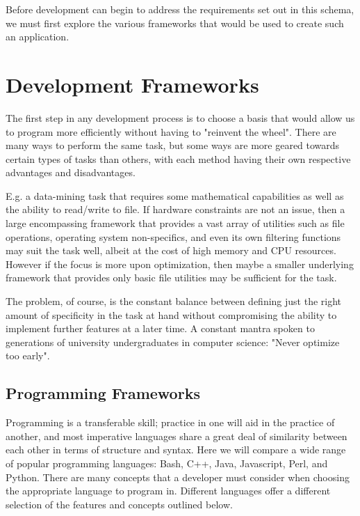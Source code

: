 Before development can begin to address the requirements set out in this schema, we must first explore the various frameworks that would be used to create such an application.


\section{Development Frameworks}

The first step in any development process is to choose a basis that would allow us to program more efficiently without having to "reinvent the wheel". There are many ways to perform the same task, but some ways are more geared towards certain types of tasks than others, with each method having their own respective advantages and disadvantages.  

E.g. a data-mining task that requires some mathematical capabilities as well as the ability to read/write to file. If hardware constraints are not an issue, then a large encompassing framework that provides a vast array of utilities such as file operations, operating system non-specifics, and even its own filtering functions may suit the task well, albeit at the cost of high memory and CPU resources. However if the focus is more upon optimization, then maybe a smaller underlying framework that provides only basic file utilities may be sufficient for the task.

The problem, of course, is the constant balance between defining just the right amount of specificity in the task at hand without compromising the ability to implement further features at a later time. A constant mantra spoken to generations of university undergraduates in computer science: "Never optimize too early".


\subsection{Programming Frameworks}

Programming is a transferable skill; practice in one will aid in the practice of another, and most imperative languages share a great deal of similarity between each other in terms of structure and syntax. Here we will compare a wide range of popular programming languages: Bash, C++, Java, Javascript, Perl, and Python. There are many concepts that a developer must consider when choosing the appropriate language to program in. Different languages offer a different selection of the features and concepts outlined below.

